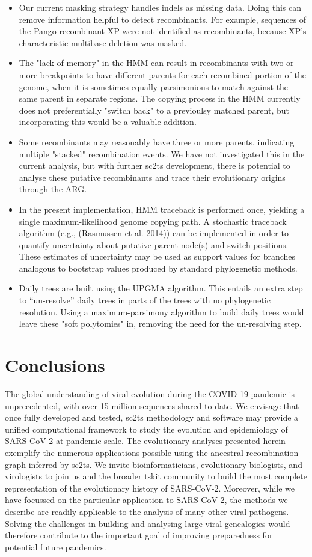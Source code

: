 \documentclass{article}
\begin{document}
\begin{itemize}
\item Our current masking strategy handles indels as missing data. Doing this can remove information helpful to detect recombinants. For example, sequences of the Pango recombinant XP were not identified as recombinants, because XP’s characteristic multibase deletion was masked.
\item The "lack of memory" in the HMM can result in  recombinants with two or more breakpoints to have different parents for each recombined portion of the genome, when it is sometimes equally parsimonious to match against the same parent in separate regions. The copying process in the HMM currently does not preferentially "switch back" to a previoulsy matched parent, but incorporating this would be a valuable addition.
\item Some recombinants may reasonably have three or more parents, indicating multiple "stacked" recombination events. We have not investigated this in the current analysis, but with further sc2ts development, there is potential to analyse these putative recombinants and trace their evolutionary origins through the ARG.
\item In the present implementation, HMM traceback is performed once, yielding a single maximum-likelihood genome copying path. A stochastic traceback algorithm (e.g., (Rasmussen et al. 2014)) can be implemented in order to quantify uncertainty about putative parent node(s) and switch positions. These estimates of uncertainty may be used as support values for branches analogous to bootstrap values produced by standard phylogenetic methods.
\item Daily trees are built using the UPGMA algorithm. This entails an extra step to ``un-resolve'' daily trees in parts of the trees with no phylogenetic resolution. Using a maximum-parsimony algorithm to build daily trees would leave these "soft polytomies" in, removing the need for the un-resolving step.
\end{itemize}

\section{Conclusions}
The global understanding of viral evolution during the COVID-19 pandemic is unprecedented, with over 15 million sequences shared to date. We envisage that once fully developed and tested, sc2ts methodology and software may provide a unified computational framework to study the evolution and epidemiology of SARS-CoV-2 at pandemic scale. The evolutionary analyses presented herein exemplify the numerous applications possible using the ancestral recombination graph inferred by sc2ts. We invite bioinformaticians, evolutionary biologists, and virologists to join us and the broader tskit community to build the most complete representation of the evolutionary history of SARS-CoV-2. Moreover, while we have focussed on the particular application to SARS-CoV-2, the methods we describe are readily applicable to the analysis of many other viral pathogens. Solving the challenges in building and analysing large viral genealogies would therefore contribute to the important goal of improving preparedness for potential future pandemics.
\end{document}
